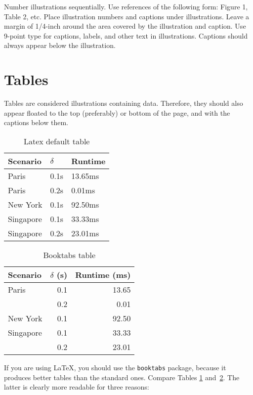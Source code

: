 \documentclass{article}
\begin{document}
Number illustrations sequentially. Use references of the following
form: Figure 1, Table 2, etc. Place illustration numbers and captions
under illustrations. Leave a margin of 1/4-inch around the area
covered by the illustration and caption.  Use 9-point type for
captions, labels, and other text in illustrations. Captions should always appear below the illustration.

\section{Tables}

Tables are considered illustrations containing data. Therefore, they should also appear floated to the top (preferably) or bottom of the page, and with the captions below them.

\begin{table}
\centering
\begin{tabular}{lll}
\hline
Scenario  & $\delta$ & Runtime \\
\hline
Paris       & 0.1s  & 13.65ms     \\
Paris       & 0.2s  & 0.01ms      \\
New York    & 0.1s  & 92.50ms     \\
Singapore   & 0.1s  & 33.33ms     \\
Singapore   & 0.2s  & 23.01ms     \\
\hline
\end{tabular}
\caption{Latex default table}
\label{tab:plain}
\end{table}

\begin{table}
\centering
\begin{tabular}{lrr}  
\toprule
Scenario  & $\delta$ (s) & Runtime (ms) \\
\midrule
Paris       & 0.1  & 13.65      \\
            & 0.2  & 0.01       \\
New York    & 0.1  & 92.50      \\
Singapore   & 0.1  & 33.33      \\
            & 0.2  & 23.01      \\
\bottomrule
\end{tabular}
\caption{Booktabs table}
\label{tab:booktabs}
\end{table}

If you are using \LaTeX, you should use the {\tt booktabs} package, because it produces better tables than the standard ones. Compare Tables \ref{tab:plain} and~\ref{tab:booktabs}. The latter is clearly more readable for three reasons:
\end{document}
